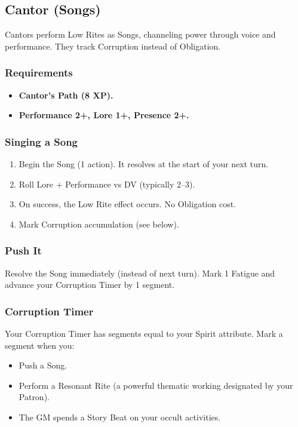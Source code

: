 \subsection{Cantor (Songs)}

Cantors perform Low Rites as Songs, channeling power through voice and performance. They track Corruption instead of Obligation.

\subsubsection{Requirements}
\begin{itemize}
  \item \textbf{Cantor's Path (8 XP).}
  \item \textbf{Performance 2+, Lore 1+, Presence 2+.}
\end{itemize}

\subsubsection{Singing a Song}
\begin{enumerate}
  \item Begin the Song (1 action). It resolves at the start of your next turn.
  \item Roll Lore + Performance vs DV (typically 2--3).
  \item On success, the Low Rite effect occurs. No Obligation cost.
  \item Mark Corruption accumulation (see below).
\end{enumerate}

\subsubsection{Push It}
Resolve the Song immediately (instead of next turn). Mark 1 Fatigue and advance your Corruption Timer by 1 segment.

\subsubsection{Corruption Timer}
Your Corruption Timer has segments equal to your Spirit attribute. Mark a segment when you:
\begin{itemize}
  \item Push a Song.
  \item Perform a Resonant Rite (a powerful thematic working designated by your Patron).
  \item The GM spends a Story Beat on your occult activities.
\end{itemize}

